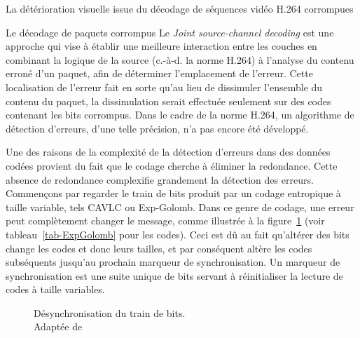 \documentclass[letterpaper, twoside, 12pt,memoire]{thETS}
\newcommand{\fig}[1]{figure~\ref{#1}}
\begin{document}
\begin{chapter}{La détérioration visuelle issue du décodage de séquences vidéo
H.264 corrompues}
\begin{section}{Le décodage de paquets corrompus}
Le \textit{Joint source-channel decoding} \citep{Duhamel2010} est une approche
qui vise à établir une meilleure interaction entre les couches en combinant la
logique de la source (c.-à-d. la norme H.264) à l'analyse du contenu erroné d'un
paquet, afin de déterminer l'emplacement de l'erreur. Cette localisation de l'erreur fait en
sorte qu'au lieu de dissimuler l'ensemble du contenu du paquet, la dissimulation
serait effectuée seulement sur des codes contenant les bits corrompus. Dans le
cadre de la norme H.264, un algorithme de détection d'erreurs, d'une telle
précision, n'a pas encore été développé.

Une des raisons de la complexité de la détection d'erreurs dans des données
codées provient du fait que le codage cherche à éliminer la redondance. Cette
absence de redondance complexifie grandement la détection des erreurs.
Commençons par regarder le train de bits produit par un codage entropique à
taille variable, tels CAVLC ou Exp-Golomb. Dans ce genre de codage, une erreur
peut complètement changer le message, comme illustrée à la \fig{fig-Desync}
(voir tableau~\ref{tab-ExpGolomb} pour les codes). Ceci est dû au fait
qu'altérer des bits change les codes et donc leurs tailles, et par conséquent
altère les codes subséquents jusqu'au prochain marqueur de synchronisation. Un
marqueur de synchronisation est une suite unique de bits servant à réinitialiser
la lecture de codes à taille variables.

\begin{figure}[htb]
\centering
{}
\caption{Désynchronisation du train de bits. \\
Adaptée de \citet[p.~11]{Ikuno2007}}
\label{fig-Desync}
\end{figure}


\end{section}
\end{chapter}
\end{document}
